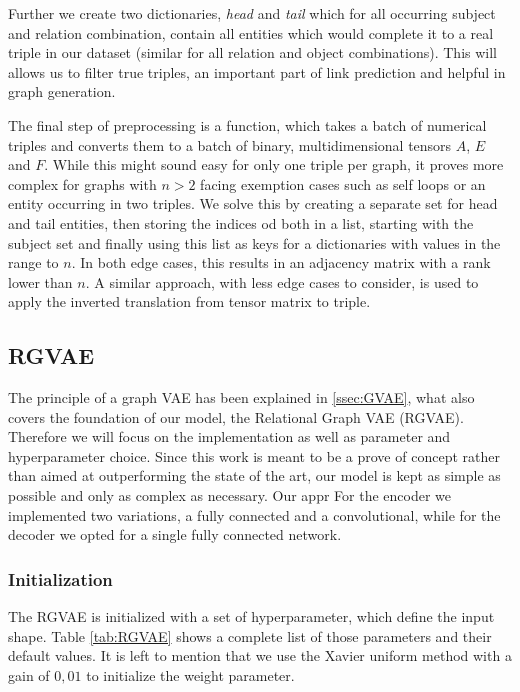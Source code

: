 Further we create two dictionaries, \textit{head} and \textit{tail} which for all occurring subject and relation combination, contain all entities which would complete it to a real triple in our dataset (similar for all relation and object combinations). This will allows us to filter true triples, an important part of link prediction and helpful in graph generation.  

The final step of preprocessing is a function, which takes a batch of numerical triples and converts them to a batch of binary, multidimensional tensors $A$, $E$ and $F$. While this might sound easy for only one triple per graph, it proves more complex for graphs with $n>2$ facing exemption cases such as self loops or an entity occurring in two triples. We solve this by creating a separate set for head and tail entities, then storing the indices od both in a list, starting with the subject set and finally using this list as keys for a dictionaries with values in the range to $n$. In both edge cases, this results in an adjacency matrix with a rank lower than $n$. A similar approach, with less edge cases to consider, is used to apply the inverted translation from tensor matrix to triple.


\subsection{RGVAE}
The principle of a graph VAE has been explained in \ref{ssec:GVAE}, what also covers the foundation of our model, the Relational Graph VAE (RGVAE). Therefore we will focus on the implementation as well as parameter and hyperparameter choice. Since this work is meant to be a prove of concept rather than aimed at outperforming the state of the art, our model is kept as simple as possible and only as complex as necessary. Our appr
For the encoder we implemented two variations, a fully connected and a convolutional, while for the decoder we opted for a single fully connected network.

\subsubsection{Initialization}

The RGVAE is initialized with a set of hyperparameter, which define the input shape. Table \ref{tab:RGVAE} shows a complete list of those parameters and their default values. It is left to mention that we use the Xavier uniform method with a gain of $0,01$ to initialize the weight parameter.

